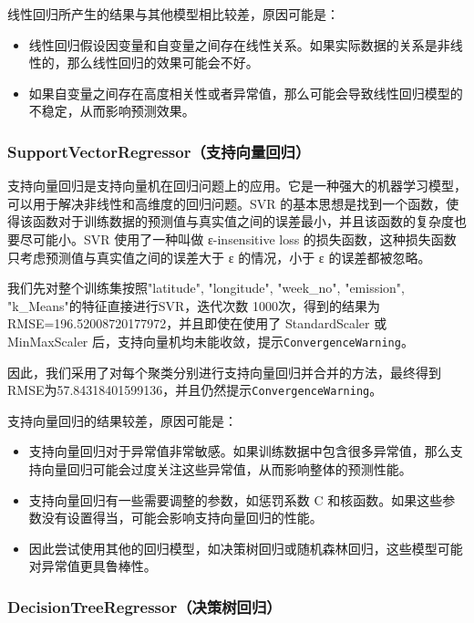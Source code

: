 \documentclass{ctexart}
\begin{document}
线性回归所产生的结果与其他模型相比较差，原因可能是：

\begin{itemize}
      \item 线性回归假设因变量和自变量之间存在线性关系。如果实际数据的关系是非线性的，那么线性回归的效果可能会不好。
      \item 如果自变量之间存在高度相关性或者异常值，那么可能会导致线性回归模型的不稳定，从而影响预测效果。
\end{itemize}

\subsubsection{SupportVectorRegressor（支持向量回归）}

支持向量回归是支持向量机在回归问题上的应用。它是一种强大的机器学习模型，可以用于解决非线性和高维度的回归问题。SVR 的基本思想是找到一个函数，使得该函数对于训练数据的预测值与真实值之间的误差最小，并且该函数的复杂度也要尽可能小。SVR 使用了一种叫做 ε-insensitive loss 的损失函数，这种损失函数只考虑预测值与真实值之间的误差大于 ε 的情况，小于 ε 的误差都被忽略。

我们先对整个训练集按照"latitude", "longitude", "week\_no", "emission", "k\_Means"的特征直接进行SVR，迭代次数 1000次，得到的结果为RMSE=196.52008720177972，并且即使在使用了 StandardScaler 或 MinMaxScaler 后，支持向量机均未能收敛，提示\texttt{ConvergenceWarning}。

因此，我们采用了对每个聚类分别进行支持向量回归并合并的方法，最终得到RMSE为57.84318401599136，并且仍然提示\texttt{ConvergenceWarning}。

支持向量回归的结果较差，原因可能是：

\begin{itemize}
      \item 支持向量回归对于异常值非常敏感。如果训练数据中包含很多异常值，那么支持向量回归可能会过度关注这些异常值，从而影响整体的预测性能。
      \item 支持向量回归有一些需要调整的参数，如惩罚系数 C 和核函数。如果这些参数没有设置得当，可能会影响支持向量回归的性能。
      \item 因此尝试使用其他的回归模型，如决策树回归或随机森林回归，这些模型可能对异常值更具鲁棒性。
\end{itemize}

\subsubsection{DecisionTreeRegressor（决策树回归）}
\end{document}
